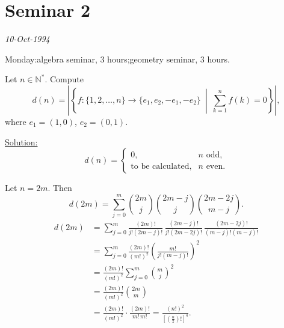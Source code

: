 
\section{Seminar 2}

\begin{center}
\end{center}
\begin{flushright}
\textit{10-Oct-1994}
\end{flushright}

\noindent Monday:\quad algebra seminar, 3 hours;\quad geometry seminar, 3 hours.

\bigskip
\noindent{}\quad Let $n\in\mathbb{N}^{*}$. Compute
\[
 d(n)=\left|\left\{
 f:\{1,2,\ldots,n\}\longrightarrow\{e_1,e_2,-e_1,-e_2\}
 \ \middle|\ \sum_{k=1}^{n}f(k)=0
 \right\}\right|,
\]
\noindent where $e_1=(1,0)$, $e_2=(0,1)$.

\medskip
\noindent\underline{Solution:}
\[
 d(n)=\begin{cases}
 0, & n\text{ odd},\\[2pt]
 \text{to be calculated}, & n\text{ even}.
 \end{cases}
\]

\noindent Let $n=2m$. Then
\[
 d(2m)=\sum_{j=0}^{m}
 \binom{2m}{j}\binom{2m-j}{j}\binom{2m-2j}{m-j}.
\]
\[
\begin{aligned}
 d(2m)
 &=\sum_{j=0}^{m}
 \frac{(2m)!}{j!(2m-j)!}\,
 \frac{(2m-j)!}{j!(2m-2j)!}\,
 \frac{(2m-2j)!}{(m-j)!(m-j)!}\\[4pt]
 &=\sum_{j=0}^{m}\frac{(2m)!}{(m!)^2}
 \left(\frac{m!}{j!(m-j)!}\right)^2\\[4pt]
 &=\frac{(2m)!}{(m!)^2}\sum_{j=0}^{m}\binom{m}{j}^{2}\\[4pt]
 &=\frac{(2m)!}{(m!)^2}\binom{2m}{m}\\[4pt]
 &=\frac{(2m)!}{(m!)^2}\cdot\frac{(2m)!}{m!\,m!}
 =\frac{(n!)^2}{\left[\left(\frac n2\right)!\right]^4}.
\end{aligned}
\]

